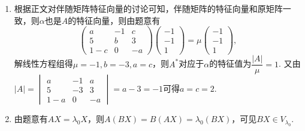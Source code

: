 \begin{enumerate}
    \item 根据正文对伴随矩阵特征向量的讨论可知，伴随矩阵的特征向量和原矩阵一致，则$\alpha$也是$A$的特征向量，则由题意有
          \[\begin{pmatrix}
                  a & -1 & c \\ 5 & b & 3 \\ 1-c & 0 & -a
              \end{pmatrix}\begin{pmatrix}
                  -1 \\ -1 \\ 1
              \end{pmatrix}=\mu\begin{pmatrix}
                  -1 \\ -1 \\ 1
              \end{pmatrix},\]
          解线性方程组得$\mu=-1,b=-3,a=c$，则$A^*$对应于$\alpha$的特征值为$\dfrac{|A|}{\mu}=1$. 又由$|A|=\begin{vmatrix}
                  a & -1 & a \\ 5 & -3 & 3 \\ 1-a & 0 & -a
              \end{vmatrix}=a-3=-1$可得$a=c=2$.

    \item \label{ex:交换基础} 由题意有$AX=\lambda_0X$，则$A(BX)=B(AX)=\lambda_0(BX)$，可见$BX\in V_{\lambda_0}$.
\end{enumerate}

